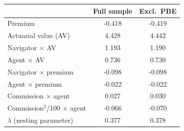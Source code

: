 \begin{tabular}{lcc}
\hline\hline
 & Full sample & Excl.\ PBE \\
\hline
Premium & -0.418 & -0.419 \\
Actuarial value (AV) & 4.428 & 4.442 \\
Navigator $\times$ AV & 1.193 & 1.190 \\
Agent $\times$ AV & 0.736 & 0.730 \\
Navigator $\times$ premium & -0.098 & -0.098 \\
Agent $\times$ premium & -0.022 & -0.022 \\
Commission $\times$ agent & 0.027 & 0.030 \\
Commission$^2$/100 $\times$ agent & -0.066 & -0.070 \\
$\lambda$ (nesting parameter) & 0.377 & 0.378 \\
\hline\hline
\end{tabular}
